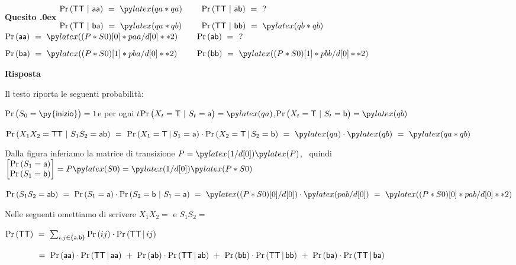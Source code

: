 \documentclass[11pt,twoside,a4paper]{article}
\newcounter{quesito}
\newenvironment{question}{\bigskip\addtocounter{quesito}{1}\bigskip\bigskip\par\textbf{Quesito \thequesito.\kern0ex}}{\par\vspace{\parskip}}
\newenvironment{answer}{\par\textbf{Risposta\quad}}{\par\vspace{\parskip}}
\begin{document}
\begin{question}
$\begin{matrix*}[l]
\Pr({\sf TT}\ |\ {\sf aa})
\ =\ \pyl{ qa*qa}
\ \ & \ \ 
\Pr({\sf TT}\ |\ {\sf ab})
\ =\ \ ?
\\[2ex]
\Pr({\sf TT}\ |\ {\sf ba})
\ =\ \pyl{ qa*qb}
\ \ & \ \ 
\Pr({\sf TT}\ |\ {\sf bb})
\ =\ \pyl{ qb*qb}
\end{matrix*}$
\hfill
$\begin{matrix*}[l]
\Pr({\sf aa})
\ =\ \pyl{(P*S0)[0]*paa/d[0]**2}
\ \ & \ \ 
\Pr({\sf ab})
\ =\ \ ?
\\[2ex]
\Pr({\sf ba})
\ =\ \pyl{(P*S0)[1]*pba/d[0]**2}
\ \ & \ \ 
\Pr({\sf bb})
\ =\ \pyl{(P*S0)[1]*pbb/d[0]**2}
\end{matrix*}$
\begin{answer}

Il testo riporta le seguenti probabilità:

$\Pr\big(S_0={\sf \py{inizio}}\big)=1$\hfill e per ogni $t$\hfill  $\Pr\big(X_t={\sf T}~|~S_t={\sf a}\big)=\pyl{qa}$,\hfill $\Pr\big(X_t={\sf T}~|~S_t={\sf b}\big)=\pyl{qb}$
\smallskip

$\Pr(X_1X_2={\sf TT}\ |\ S_1S_2={\sf ab})
\ =\ \Pr(X_1={\sf T}\, |\, S_1= {\sf a})\cdot\Pr(X_2={\sf T}\, |\,S_2= {\sf b})
\ =\ \pyl{qa}\cdot\pyl{qb}
\ =\ \pyl{qa*qb}$

Dalla figura inferiamo la matrice di transizione $P=\pyl{1/d[0]}\pyl{P}$, \ quindi\hfill  
$\begin{bmatrix}\Pr(S_1={\sf a})\\\Pr(S_1={\sf b})\end{bmatrix}=P\pyl{S0}=\pyl{1/d[0]}\pyl{P*S0}$
\hfil
\smallskip

$\Pr(S_1S_2={\sf ab})
\ =\ 
\Pr(S_1={\sf a})\cdot\Pr(S_2={\sf b}\ |\ S_1={\sf a})
\ =\ 
\pyl{(P*S0)[0]/d[0]}\cdot \pyl{pab/d[0]}
\ =\ 
\pyl{(P*S0)[0]*pab/d[0]**2}$


Nelle seguenti omettiamo di scrivere $X_1X_2=$ e $S_1S_2=$

$\Pr({\sf TT})
\ =\ \sum_{i,j\in\{{\sf a},{\sf b}\}} \Pr(ij)\cdot\Pr({\sf TT}\,|\,ij)$

$\phantom{\Pr({\sf TT})}
\ =\ \Pr({\sf aa})\cdot\Pr({\sf TT}\, |\, {\sf aa})
\ +\ \Pr({\sf ab})\cdot\Pr({\sf TT}\, |\, {\sf ab})
\ +\ \Pr({\sf bb})\cdot\Pr({\sf TT}\, |\, {\sf bb})
\ +\ \Pr({\sf ba})\cdot\Pr({\sf TT}\, |\, {\sf ba})$


\end{answer}
\end{question}
\end{document}
